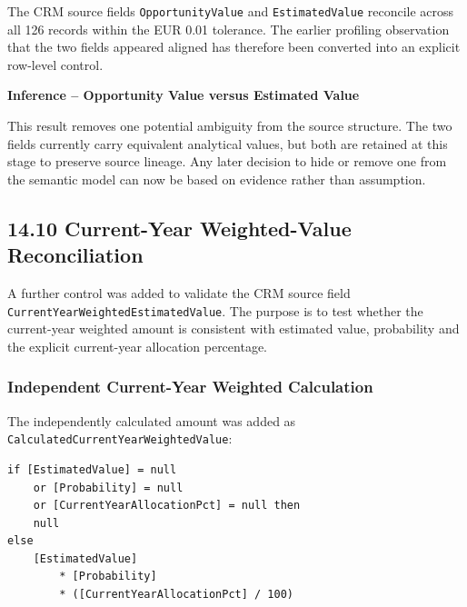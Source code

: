 \documentclass[11pt,a4paper]{article}
\begin{document}
\begin{successbox}

\textbf{\color{SuccessGreen}{Opportunity-Value Reconciliation Result}}

The CRM source fields \texttt{OpportunityValue} and
\texttt{EstimatedValue} reconcile across all 126 records within the EUR 0.01
tolerance. The earlier profiling observation that the two fields appeared
aligned has therefore been converted into an explicit row-level control.

\end{successbox}

\begin{inferencebox}

\textbf{Inference -- Opportunity Value versus Estimated Value}

This result removes one potential ambiguity from the source structure. The two
fields currently carry equivalent analytical values, but both are retained at
this stage to preserve source lineage. Any later decision to hide or remove one
from the semantic model can now be based on evidence rather than assumption.

\end{inferencebox}

\subsection{14.10 Current-Year Weighted-Value Reconciliation}

A further control was added to validate the CRM source field
\texttt{CurrentYearWeightedEstimatedValue}. The purpose is to test whether the
current-year weighted amount is consistent with estimated value, probability
and the explicit current-year allocation percentage.

\subsubsection*{Independent Current-Year Weighted Calculation}

The independently calculated amount was added as
\texttt{CalculatedCurrentYearWeightedValue}:

\begin{lstlisting}[style=powerquery]
if [EstimatedValue] = null
    or [Probability] = null
    or [CurrentYearAllocationPct] = null then
    null
else
    [EstimatedValue]
        * [Probability]
        * ([CurrentYearAllocationPct] / 100)
\end{lstlisting}
\end{document}
